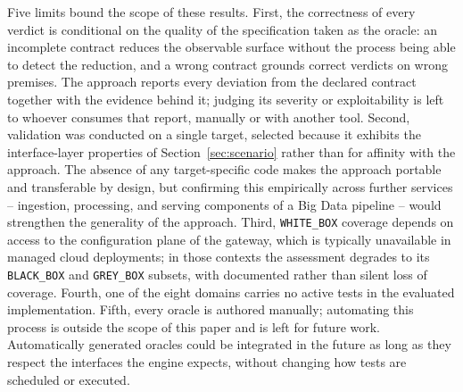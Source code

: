 Five limits bound the scope of these results.
First, the correctness of every verdict is conditional on the quality of the specification taken as the oracle: an incomplete contract reduces the observable surface without the process being able to detect the reduction, and a wrong contract grounds correct verdicts on wrong premises. The approach reports every deviation from the declared contract together with the evidence behind it; judging its severity or exploitability is left to whoever consumes that report, manually or with another tool.
Second, validation was conducted on a single target, selected because it exhibits the interface-layer properties of Section~\ref{sec:scenario} rather than for affinity with the approach. The absence of any target-specific code makes the approach portable and transferable by design, but confirming this empirically across further services -- ingestion, processing, and serving components of a Big Data pipeline -- would strengthen the generality of the approach.
Third, \texttt{WHITE\_BOX} coverage depends on access to the configuration plane of the gateway, which is typically unavailable in managed cloud deployments; in those contexts the assessment degrades to its \texttt{BLACK\_BOX} and \texttt{GREY\_BOX} subsets, with documented rather than silent loss of coverage.
Fourth, one of the eight domains carries no active tests in the evaluated implementation.
Fifth, every oracle is authored manually; automating this process is outside the scope of this paper and is left for future work. Automatically generated oracles could be integrated in the future as long as they respect the interfaces the engine expects, without changing how tests are scheduled or executed.

